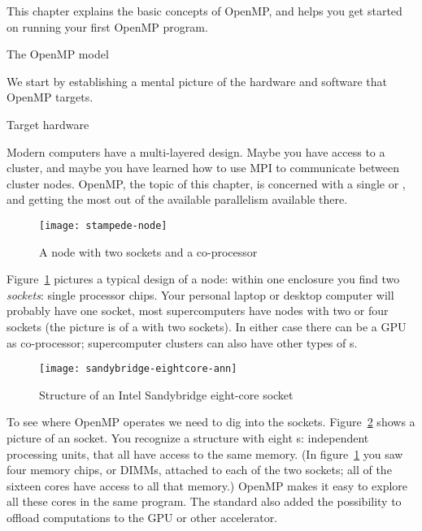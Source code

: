 
This chapter explains the basic concepts of OpenMP, and helps you get
started on running your first OpenMP program.

 {The OpenMP model}

We start by establishing a mental picture of the hardware and software
that OpenMP targets.

 {Target hardware}

Modern computers have a multi-layered design. Maybe you have access to
a cluster, and maybe you have learned how to use MPI to communicate
between cluster nodes. OpenMP, the topic of this chapter, is concerned
with a single  or ,
and getting the most out of the available parallelism available there.

\begin{figure}[ht]
\texttt{[image: stampede-node]}
\caption{A node with two sockets and a co-processor}
\label{fig:stampedenode}
\end{figure}
%
Figure~\ref{fig:stampedenode} pictures a typical design of a node:
within one enclosure you find two \emph{sockets}:
single processor chips.
Your personal laptop or desktop computer will probably
have one socket, most supercomputers have nodes with two or four
sockets (the picture is of a  with two
sockets).
In either case there can be a \ac{GPU} as co-processor;
supercomputer clusters can also have other types of s.

\begin{figure}[ht]
  \texttt{[image: sandybridge-eightcore-ann]}
  \caption{Structure of an Intel Sandybridge eight-core socket}
  \label{fig:sandybridge}
\end{figure}
%
To see where OpenMP operates we need to dig into the
sockets. Figure~\ref{fig:sandybridge} shows a picture of an
 socket. You recognize a structure
with eight s: independent processing
units, that all have access to the same memory.
(In
figure~\ref{fig:stampedenode} you saw four memory chips,
or DIMMs,
attached to
each of the two sockets; all of the sixteen cores have access to all
that memory.)
OpenMP makes it easy to explore all these cores in the same program.
The  standard also added the possibility
to offload computations to the GPU or other accelerator.

